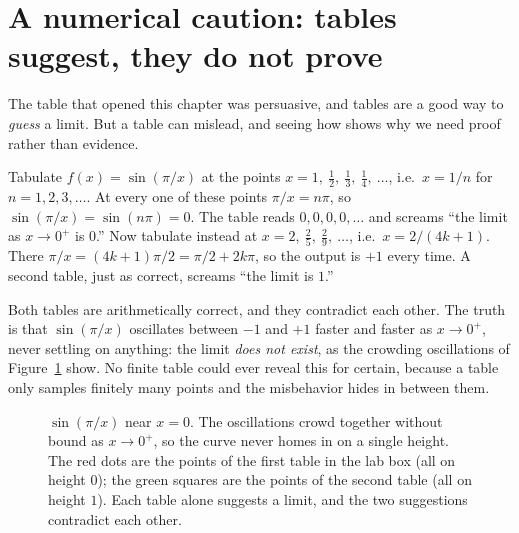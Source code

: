 \section{A numerical caution: tables suggest, they do not prove}

The table that opened this chapter was persuasive, and tables are a good way to \emph{guess}
a limit. But a table can mislead, and seeing how shows why we need
proof rather than evidence.

\begin{labbox}
Tabulate $f(x) = \sin(\pi/x)$ at the points $x = 1,\ \tfrac{1}{2},\ \tfrac{1}{3},\
\tfrac{1}{4},\ \dots$, i.e.\ $x = 1/n$ for $n=1,2,3,\dots$. At every one of these points $\pi/x =
n\pi$, so $\sin(\pi/x) = \sin(n\pi) = 0$. The table reads $0,0,0,0,\dots$ and screams ``the limit
as $x\to 0^+$ is $0$.'' Now tabulate instead at $x = 2,\ \tfrac{2}{5},\ \tfrac{2}{9},\ \dots$,
i.e.\ $x = 2/(4k+1)$. There $\pi/x = (4k+1)\pi/2 = \pi/2 + 2k\pi$, so the output is
$+1$ every time. A second table, just as correct, screams ``the limit is $1$.''
\end{labbox}

Both tables are arithmetically correct, and they contradict each other. The truth is that
$\sin(\pi/x)$ oscillates between $-1$ and $+1$ faster and faster as $x \to 0^+$, never settling
on anything: the limit \emph{does not exist}, as the crowding oscillations of
Figure~\ref{ch05:oscillation} show. No finite table could ever reveal this for certain,
because a table only samples finitely many points and the misbehavior hides in between them.

\begin{figure}[htbp]
\centering
{}
\caption{$\sin(\pi/x)$ near $x=0$. The oscillations crowd together without bound as $x\to 0^+$,
so the curve never homes in on a single height. The red dots are the points of the first table
in the lab box (all on height $0$); the green squares are the points of the second table (all on
height $1$). Each table alone suggests a limit, and the two suggestions contradict each other.}
\label{ch05:oscillation}
\end{figure}

